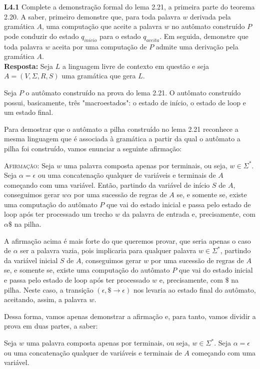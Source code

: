 
\noindent \textbf{L4.1} Complete a demonstração formal do lema 2.21, a primeira parte do teorema 2.20. A saber, primeiro demonstre que, para toda palavra $w$ derivada pela gramática $A$, uma computação que aceite a palavra $w$ no autômato construído $P$ pode conduzir do estado $q_{inicio}$ para o estado $q_{aceita}$. Em seguida, demonstre que toda palavra $w$ aceita por uma computação de $P$ admite uma derivação pela gramática $A$. \\[3pt]
\textbf{Resposta: } Seja $L$ a linguagem livre de contexto em questão e seja $A = (V, \Sigma, R, S)$ uma gramática que gera $L$.

Seja $P$ o autômato construído na prova do lema 2.21. O autômato construído possui, basicamente, três "macroestados": o estado de início, o estado de loop e um estado final.

Para demostrar que o autômato a pilha construído no lema 2.21 reconhece a mesma linguagem que é associada à gramática a partir da qual o autômato a pilha foi construído, vamos enunciar a seguinte afirmação:

\textsc{Afirmação:} Seja $w$ uma palavra composta apenas por terminais, ou seja, $w \in \Sigma^*$. Seja $\alpha = \epsilon$ ou uma concatenação qualquer de variáveis e terminais de $A$ começando com uma variável. Então, partindo da variável de início $S$ de $A$, conseguimos gerar $w\alpha$ por uma sucessão de regras de $A$ se, e somente se, existe uma computação do autômato $P$ que vai do estado inicial e passa pelo estado de loop após ter processado um trecho $w$ da palavra de entrada e, precisamente, com $\alpha\$$ na pilha.

A afirmação acima é mais forte do que queremos provar, que seria apenas o caso de $\alpha$ ser a palavra vazia, pois implicaria para qualquer palavra $w \in \Sigma^*$, partindo da variável inicial $S$ de $A$, conseguimos gerar $w$ por uma sucessão de regras de $A$ se, e somente se, existe uma computação do autômato $P$ que vai do estado inicial e passa pelo estado de loop após ter processado $w$ e, precisamente, com $\$$ na pilha. Neste caso, a transição $(\epsilon, \$ \rightarrow \epsilon)$ nos levaria ao estado final do autômato, aceitando, assim, a palavra $w$.

Dessa forma, vamos apenas demonstrar a afirmação e, para tanto, vamos dividir a prova em duas partes, a saber:

Seja $w$ uma palavra composta apenas por terminais, ou seja, $w \in \Sigma^*$. Seja $\alpha = \epsilon$ ou uma concatenação qualquer de variáveis e terminais de $A$ começando com uma variável.


